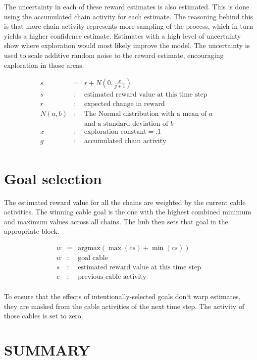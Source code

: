 \documentclass[oneside,twocolumn]{article}
\begin{document}
The uncertainty in each of these reward estimates is also estimated. This is done using the accumulated chain activity for each estimate. The reasoning behind this is that more chain activity represents more sampling of the process, which in turn yields a higher confidence estimate. 
Estimates with a high level of uncertainty show where exploration would most likely improve the model. The uncertainty is used to scale additive random noise to the reward estimate, encouraging exploration in those areas.

\begin{eqnarray*}
s &= & r + N \left ( 0, \frac{x}{g + 1} \right )\\ 
s &:& \mbox{estimated reward value at this time step} \\
r &:& \mbox{expected change in reward} \\
N(a,b) &:& \mbox{The Normal distribution with a mean of $a$ } \\
&& \mbox{and a standard deviation of $b$} \\
x &:& \mbox{exploration constant} = .1 \\
g &:& \mbox{accumulated chain activity} \\
\end{eqnarray*}

\section*{\color{copper} Goal selection}

The estimated reward value for all the chains are weighted by the current cable activities. The winning cable goal is the one with the highest combined minimum and maximum values across all chains. The hub then sets that goal in the appropriate block. 

\begin{eqnarray*}
w &= & \mbox{argmax} ( \max (cs) + \min (cs) )\\ 
w &:& \mbox{goal cable} \\
s &:& \mbox{estimated reward value at this time step} \\
c &:& \mbox{previous cable activity} \\
\end{eqnarray*}

To ensure that the effects of intentionally-selected goals don`t warp estimates, they are masked from the cable activities of the next time step. The activity of those cables is set to zero.

\section*{\color{copper} SUMMARY}
\end{document}
